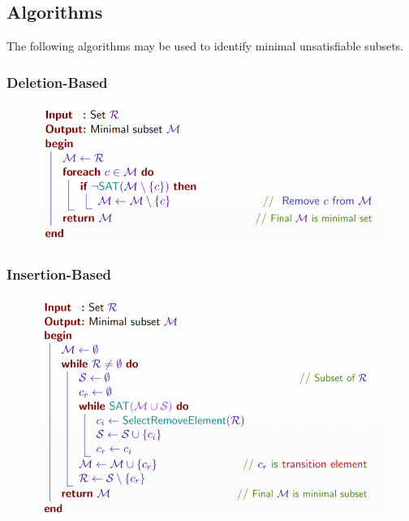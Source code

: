 \documentclass[10pt,a4paper]{report}
\begin{document}
\subsection{Algorithms}
The following algorithms may be used to identify minimal unsatisfiable subsets.
\subsubsection{Deletion-Based}
\begin{figure}[H]
    \centering
    \includegraphics[scale=0.5]{12.png}
\end{figure}
\subsubsection{Insertion-Based}
\begin{figure}[H]
    \centering
    \includegraphics[scale=0.5]{13.png}
\end{figure}
\end{document}
